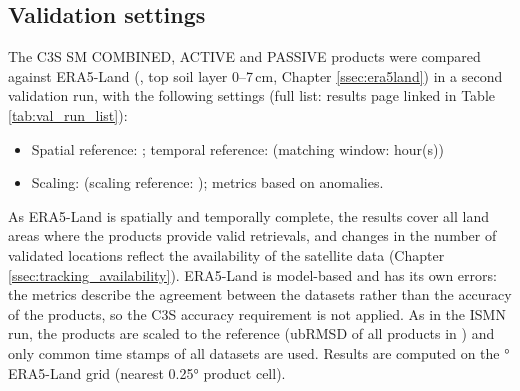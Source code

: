 \def\runidx{\detokenize{$<ContentVars['report_run_index']>$}}

\subsection{Validation settings} \label{ssec:era5_settings}

\noindent The \ac{C3S} SM COMBINED, ACTIVE and PASSIVE products were compared against ERA5-Land (, top soil layer 0--7\,cm, Chapter \ref{ssec:era5land}) in a second validation run, with the following settings (full list: results page linked in Table \ref{tab:val_run_list}):

\begin{itemize}
    \item Spatial reference: \textbf{}; temporal reference: \textbf{} (matching window:  hour(s))
    \item Scaling: \textbf{} (scaling reference: \textbf{}); metrics  based on anomalies.
\end{itemize}

\noindent As ERA5-Land is spatially and temporally complete, the results cover all land areas where the products provide valid retrievals, and changes in the number of validated locations reflect the availability of the satellite data (Chapter \ref{ssec:tracking_availability}).
ERA5-Land is model-based and has its own errors: the metrics describe the agreement between the datasets rather than the accuracy of the products, so the \ac{C3S} accuracy requirement is not applied.
As in the \ac{ISMN} run, the products are scaled to the reference (\ac{ubRMSD} of all products in \unitsm{}) and only common time stamps of all datasets are used.
Results are computed on the ° ERA5-Land grid (nearest 0.25° product cell).

